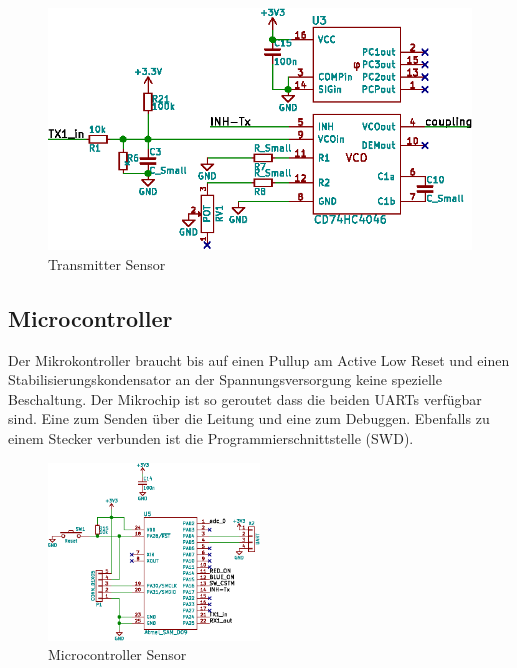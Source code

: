\begin{figure}[h!t]
    \centering
    \includegraphics[width=1\textwidth]{images/sensor-sch/sensor--sch--transmitter.eps}
    \caption[Sensor: Schema Transmitter]{Transmitter Sensor}
\end{figure}



\subsection{Microcontroller}
\label{subsec:hw:sensor:mcu}

Der Mikrokontroller braucht bis auf einen Pullup am Active Low Reset und einen Stabilisierungskondensator an der Spannungsversorgung keine spezielle Beschaltung. Der Mikrochip ist so geroutet dass die beiden UARTs verfügbar sind. Eine zum Senden über die Leitung und eine zum Debuggen. Ebenfalls zu einem Stecker verbunden ist die Programmierschnittstelle (SWD).

\begin{figure}[h!t]
    \centering
    \includegraphics[width=0.5\textwidth]{images/sensor-sch/sensor--sch--mcu.eps}
    \caption[Sensor: Schema Microcontroller]{Microcontroller Sensor}
\end{figure}

